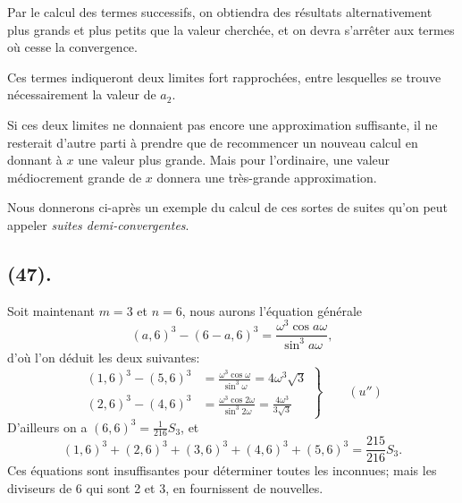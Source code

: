 \documentclass{article}
\begin{document}
Par le calcul des termes successifs, on obtiendra des résultats alternativement plus grands et plus petits que la valeur cherchée, et on devra s'arrêter aux termes où cesse la convergence.

Ces termes indiqueront deux limites fort rapprochées, entre lesquelles se trouve nécessairement la valeur de $a_{2}$.

Si ces deux limites ne donnaient pas encore une approximation suffisante, il ne resterait d'autre parti à prendre que de recommencer un nouveau calcul en donnant à $x$ une valeur plus grande. Mais pour l'ordinaire, une valeur médiocrement grande de $x$ donnera une très-grande approximation.

Nous donnerons ci-après un exemple du calcul de ces sortes de suites qu'on peut appeler \emph{suites demi-convergentes}.


\subsection*{(47).}

Soit maintenant $m=3$ et $n=6$, nous aurons l'équation générale
\[ (a,6)^{3}-(6-a,6)^{3}=\frac{\omega^{3}\cos a\omega}{\sin^{3}a\omega}, \]
d'où l'on déduit les deux suivantes:
\[ \left.\begin{aligned} (1,6)^{3}-(5,6)^{3}&=\frac{\omega^{3}\cos\omega}{\sin^{3}\omega}=4\omega^{3}\sqrt{3}\\ (2,6)^{3}-(4,6)^{3}&=\frac{\omega^{3}\cos 2\omega}{\sin^{3}2\omega}=\frac{4\omega^{3}}{3\sqrt{3}} \end{aligned}\right\}\qquad(u'') \]
D'ailleurs on a $(6,6)^{3}=\frac{1}{216}S_{3}$, et
\[ (1,6)^{3}+(2,6)^{3}+(3,6)^{3}+(4,6)^{3}+(5,6)^{3}=\frac{215}{216}S_{3}. \]
Ces équations sont insuffisantes pour déterminer toutes les inconnues; mais les diviseurs de 6 qui sont 2 et 3, en fournissent de nouvelles.
\end{document}
